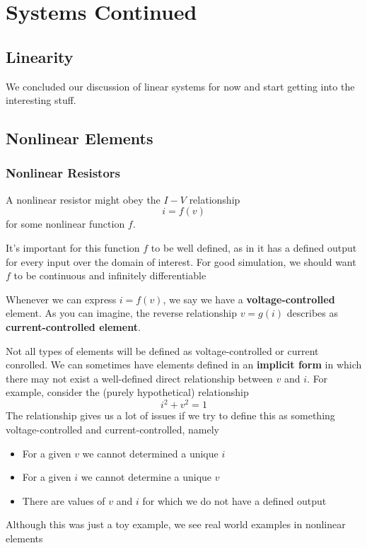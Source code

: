 \documentclass{report}
\begin{document}
\chapter{Systems Continued}


\section{Linearity}
We concluded our discussion of linear systems for now and start getting into the interesting stuff.

\section{Nonlinear Elements}
\subsection{Nonlinear Resistors}
A nonlinear resistor might obey the $I-V$ relationship
\begin{equation*}
    i = f(v)
\end{equation*}
for some nonlinear function $f$.

It's important for this function $f$ to be well defined, as in it has a defined output for every input over the domain of interest. For good simulation, we should want $f$ to be continuous and infinitely %
differentiable

Whenever we can express $i = f(v)$, we say we have a \textbf{voltage-controlled} element. As you can imagine, the reverse relationship $v = g(i)$ describes as \textbf{current-controlled element}.

Not all types of elements will be defined as voltage-controlled or current conrolled. We can sometimes have elements defined in an \textbf{implicit form} in which there may not exist a well-defined direct relationship between $v$ and $i$. For example, consider the (purely hypothetical) relationship
\begin{equation*}
    i^2 + v^2 = 1
\end{equation*}
The relationship gives us a lot of issues if we try to define this as something voltage-controlled and current-controlled, namely
\begin{itemize}
    \item For a given $v$ we cannot determined a unique $i$
    \item For a given $i$ we cannot determine a unique $v$
    \item There are values of $v$ and $i$ for which we do not have a defined output
\end{itemize}
Although this was just a toy example, we see real world examples in nonlinear elements
\end{document}
